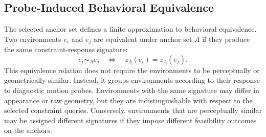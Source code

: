 






\subsection{Probe-Induced Behavioral Equivalence}

The selected anchor set defines a finite approximation to behavioral equivalence. Two environments $e_i$ and $e_j$ are equivalent under anchor set $A$ if they produce the same constraint-response signature:
%
\begin{equation}
    e_i \sim_A e_j
    \quad\Longleftrightarrow\quad
    z_A(e_i)=z_A(e_j).
\end{equation}
%
This equivalence relation does not require the environments to be perceptually or geometrically similar. Instead, it groups environments according to their response to diagnostic motion probes. Environments with the same signature may differ in appearance or raw geometry, but they are indistinguishable with respect to the selected constraint queries. Conversely, environments that are perceptually similar may be assigned different signatures if they impose different feasibility outcomes on the anchors.


